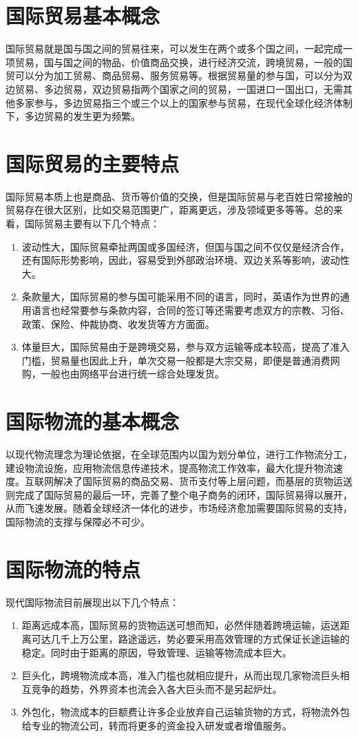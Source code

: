 \section{国际贸易基本概念}
国际贸易就是国与国之间的贸易往来，可以发生在两个或多个国之间，一起完成一项贸易，国与国之间的物品、价值商品交换，进行经济交流，跨境贸易，一般的国贸可以分为加工贸易、商品贸易、服务贸易等。根据贸易量的参与国，可以分为双边贸易、多边贸易，双边贸易指两个国家之间的贸易，一国进口一国出口，无需其他多家参与，多边贸易指三个或三个以上的国家参与贸易，在现代全球化经济体制下，多边贸易的发生更为频繁。
\section{国际贸易的主要特点}
国际贸易本质上也是商品、货币等价值的交换，但是国际贸易与老百姓日常接触的贸易存在很大区别，比如交易范围更广，距离更远，涉及领域更多等等。总的来看，国际贸易主要有以下几个特点：
\vspace{-0.5ex}
\begin{enumerate}[(1)]
\setlength{\itemsep}{0ex}
\item 波动性大，国际贸易牵扯两国或多国经济，但国与国之间不仅仅是经济合作，还有国际形势影响，因此，容易受到外部政治环境、双边关系等影响，波动性大。
\item 条款量大，国际贸易的参与国可能采用不同的语言，同时，英语作为世界的通用语言也经常要参与条款内容，合同的签订等还需要考虑双方的宗教、习俗、政策、保险、仲裁协商、收发货等方方面面。
\item 体量巨大，国际贸易由于是跨境交易，参与双方运输等成本较高，提高了准入门槛，贸易量也因此上升，单次交易一般都是大宗交易，即便是普通消费网购，一般也由网络平台进行统一综合处理发货。
\end{enumerate}
\section{国际物流的基本概念}
以现代物流理念为理论依据，在全球范围内以国为划分单位，进行工作物流分工，建设物流设施，应用物流信息传递技术，提高物流工作效率，最大化提升物流速度。互联网解决了国际贸易的商品交易、货币支付等上层问题，而基层的货物运送则完成了国际贸易的最后一环，完善了整个电子商务的闭环，国际贸易得以展开，从而飞速发展。随着全球经济一体化的进步，市场经济愈加需要国际贸易的支持，国际物流的支撑与保障必不可少。
\section{国际物流的特点}
现代国际物流目前展现出以下几个特点：
\begin{enumerate}[(1)]
\setlength{\itemsep}{0ex}
\item 距离远成本高，国际贸易的货物运送可想而知，必然伴随着跨境运输，运送距离可达几千上万公里，路途遥远，势必要采用高效管理的方式保证长途运输的稳定。同时由于距离的原因，导致管理、运输等物流成本巨大。
\item 巨头化，跨境物流成本高，准入门槛也就相应提升，从而出现几家物流巨头相互竞争的趋势，外界资本也流会入各大巨头而不是另起炉灶。
\item 外包化，物流成本的巨额费让许多企业放弃自己运输货物的方式，将物流外包给专业的物流公司，转而将更多的资金投入研发或者增值服务。
\end{enumerate}

